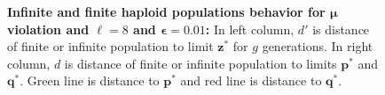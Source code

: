 \begin{figure}[!b]
\begin{center}
\hspace{-3em}%
\vspace{-0.5em} \hspace{-3em}%
\caption[\textbf{Infinite and finite haploid population behavior for $\bm{\mu}$ violation and $\ell = 8$ and 
$\bm{\epsilon} = 0.01$}]{\textbf{Infinite and finite haploid populations behavior for $\bm{\mu}$ violation and $\ell = 8$ and $\bm{\epsilon} = 0.01$:} 
In left column, $d'$ is distance of finite or infinite population to limit $\bm{z}^\ast$ for $g$ generations. 
In right column, $d$ is distance of finite or infinite population to limits $\bm{p}^\ast$ and $\bm{q}^\ast$. Green line is distance to $\bm{p}^\ast$ and red line is distance to $\bm{q}^\ast$.}
\label{oscillation_8h_vio_mu_0.01}
\end{center}
\end{figure}


